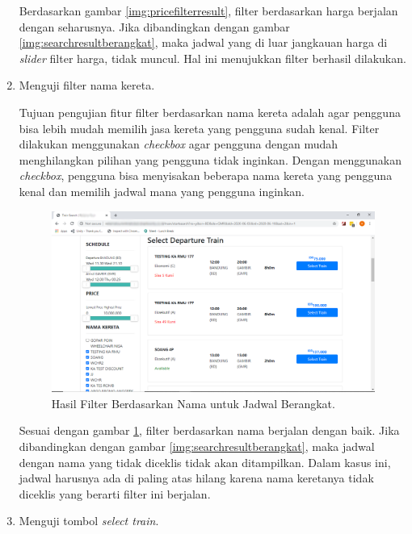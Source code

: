 \begin{enumerate}
        Berdasarkan gambar \ref{img:pricefilterresult}, filter berdasarkan harga berjalan dengan seharusnya. Jika dibandingkan dengan gambar \ref{img:searchresultberangkat}, maka jadwal yang di luar jangkauan harga di \textit{slider} filter harga, tidak muncul. Hal ini menujukkan filter berhasil dilakukan.
        
        \item Menguji filter nama kereta.
        
        Tujuan pengujian fitur filter berdasarkan nama kereta adalah agar pengguna bisa lebih mudah memilih jasa kereta yang pengguna sudah kenal. Filter dilakukan menggunakan \textit{checkbox} agar pengguna dengan mudah menghilangkan pilihan yang pengguna tidak inginkan. Dengan menggunakan \textit{checkbox}, pengguna bisa menyisakan beberapa nama kereta yang pengguna kenal dan memilih jadwal mana yang pengguna inginkan.
        
        \begin{figure}[H]
        \center
        \includegraphics[width=\textwidth,height=\textheight,keepaspectratio]{Gambar/Filter name result.png}
        \caption{Hasil Filter Berdasarkan Nama untuk Jadwal Berangkat.}
            \label{img:namefilterresult}
        \end{figure}
        
        Sesuai dengan gambar \ref{img:namefilterresult}, filter berdasarkan nama berjalan dengan baik. Jika dibandingkan dengan gambar \ref{img:searchresultberangkat}, maka jadwal dengan nama yang tidak diceklis tidak akan ditampilkan. Dalam kasus ini, jadwal harusnya ada di paling atas hilang karena nama keretanya tidak diceklis yang berarti filter ini berjalan.
        
        \item Menguji tombol \textit{select train}.
        

\end{enumerate}
